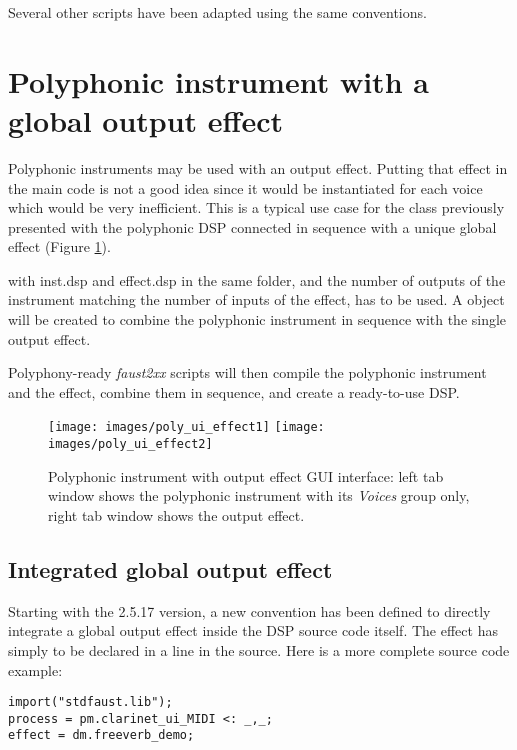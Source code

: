 Several other scripts have been adapted using the same conventions.

\section{Polyphonic instrument with a global output effect}

Polyphonic instruments may be used with an output effect. Putting that effect in the main \faust code is not a good idea since it would be instantiated for each voice which would be very inefficient. This is a typical use case for the   class previously presented with the polyphonic DSP connected in sequence with a unique global effect (Figure \ref{fig:poly-ui-effect}). 

 with inst.dsp and effect.dsp in the same folder,  and the number of outputs of the instrument matching the number of inputs of the effect, has to be used. A  object will be created to combine the polyphonic instrument in sequence with the single output effect. 

Polyphony-ready {\it faust2xx} scripts will then compile the polyphonic instrument and the effect, combine them in sequence, and create a ready-to-use DSP.  

\begin{figure}[!ht]
\begin{center}
\texttt{[image: images/poly\_ui\_effect1]}
\texttt{[image: images/poly\_ui\_effect2]}
\caption{\footnotesize Polyphonic instrument with output effect GUI interface: left tab window shows the polyphonic instrument with its {\it Voices} group only, right tab window shows the output effect.}
\label{fig:poly-ui-effect}
\end{center}
\end{figure}

\subsection{Integrated global output effect}

Starting with the 2.5.17 version, a new convention has been defined to directly integrate a global output effect inside the DSP source code itself. The effect has simply to be declared in a  line in the source. Here is a more complete source code example:

\begin{lstlisting}
import("stdfaust.lib");
process = pm.clarinet_ui_MIDI <: _,_;
effect = dm.freeverb_demo;
\end{lstlisting}

